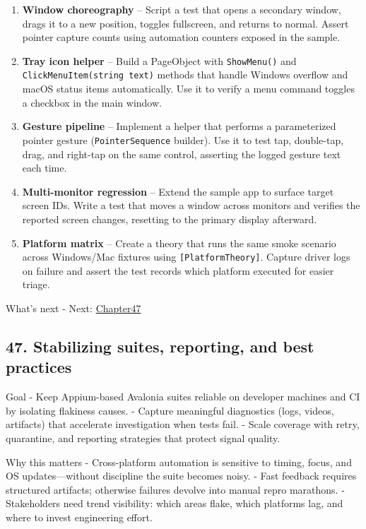 \begin{enumerate}
\def\labelenumi{\arabic{enumi}.}
\tightlist
\item
  \textbf{Window choreography} -- Script a test that opens a secondary
  window, drags it to a new position, toggles fullscreen, and returns to
  normal. Assert pointer capture counts using automation counters
  exposed in the sample.
\item
  \textbf{Tray icon helper} -- Build a PageObject with
  \passthrough{\lstinline!ShowMenu()!} and
  \passthrough{\lstinline!ClickMenuItem(string text)!} methods that
  handle Windows overflow and macOS status items automatically. Use it
  to verify a menu command toggles a checkbox in the main window.
\item
  \textbf{Gesture pipeline} -- Implement a helper that performs a
  parameterized pointer gesture
  (\passthrough{\lstinline!PointerSequence!} builder). Use it to test
  tap, double-tap, drag, and right-tap on the same control, asserting
  the logged gesture text each time.
\item
  \textbf{Multi-monitor regression} -- Extend the sample app to surface
  target screen IDs. Write a test that moves a window across monitors
  and verifies the reported screen changes, resetting to the primary
  display afterward.
\item
  \textbf{Platform matrix} -- Create a theory that runs the same smoke
  scenario across Windows/Mac fixtures using
  \passthrough{\lstinline![PlatformTheory]!}. Capture driver logs on
  failure and assert the test records which platform executed for easier
  triage.
\end{enumerate}

What's next - Next: \href{Chapter47.md}{Chapter47}

\newpage

\subsection{47. Stabilizing suites, reporting, and best
practices}\label{stabilizing-suites-reporting-and-best-practices}

Goal - Keep Appium-based Avalonia suites reliable on developer machines
and CI by isolating flakiness causes. - Capture meaningful diagnostics
(logs, videos, artifacts) that accelerate investigation when tests fail.
- Scale coverage with retry, quarantine, and reporting strategies that
protect signal quality.

Why this matters - Cross-platform automation is sensitive to timing,
focus, and OS updates---without discipline the suite becomes noisy. -
Fast feedback requires structured artifacts; otherwise failures devolve
into manual repro marathons. - Stakeholders need trend visibility: which
areas flake, which platforms lag, and where to invest engineering
effort.

